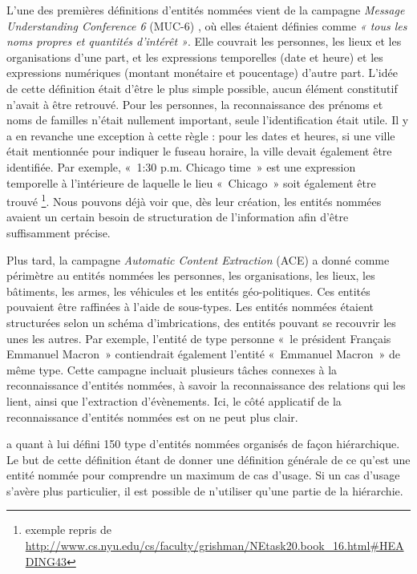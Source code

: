 \documentclass[PhD-Yoann-Dupont.tex]{subfiles}
\begin{document}
L'une des premières définitions d'entités nommées vient de la campagne \textit{Message Understanding Conference 6} (MUC-6) \citep{grishman1996message}, où elles étaient définies comme \emph{« tous les noms propres et quantités d'intérêt »}. Elle couvrait les personnes, les lieux et les organisations d'une part, et les expressions temporelles (date et heure) et les expressions numériques (montant monétaire et poucentage) d'autre part. L'idée de cette définition était d'être le plus simple possible, aucun élément constitutif n'avait à être retrouvé. Pour les personnes, la reconnaissance des prénoms et noms de familles n'était nullement important, seule l'identification était utile. Il y a en revanche une exception à cette règle : pour les dates et heures, si une ville était mentionnée pour indiquer le fuseau horaire, la ville devait également être identifiée. Par exemple, «\ 1:30 p.m. Chicago time\ » est une expression temporelle à l'intérieure de laquelle le lieu «\ Chicago\ » soit également être trouvé \footnote{exemple repris de \url{http://www.cs.nyu.edu/cs/faculty/grishman/NEtask20.book_16.html\#HEADING43}}. Nous pouvons déjà voir que, dès leur création, les entités nommées avaient un certain besoin de structuration de l'information afin d'être suffisamment précise.

Plus tard, la campagne \textit{Automatic Content Extraction} (ACE) \citep{doddington2004automatic} a donné comme périmètre au entités nommées les personnes, les organisations, les lieux, les bâtiments, les armes, les véhicules et les entités géo-politiques. Ces entités pouvaient être raffinées à l'aide de sous-types. Les entités nommées étaient structurées selon un schéma d'imbrications, des entités pouvant se recouvrir les unes les autres. Par exemple, l'entité de type personne «\ le président Français Emmanuel Macron\ » contiendrait également l'entité «\ Emmanuel Macron\ » de même type. Cette campagne incluait plusieurs tâches connexes à la reconnaissance d'entités nommées, à savoir la reconnaissance des relations qui les lient, ainsi que l'extraction d'évènements. Ici, le côté applicatif de la reconnaissance d'entités nommées est on ne peut plus clair.

\citet{sekine2004} a quant à lui défini 150 type d'entités nommées organisés de façon hiérarchique. Le but de cette définition étant de donner une définition générale de ce qu'est une entité nommée pour comprendre un maximum de cas d'usage. Si un cas d'usage s'avère plus particulier, il est possible de n'utiliser qu'une partie de la hiérarchie.
\end{document}

